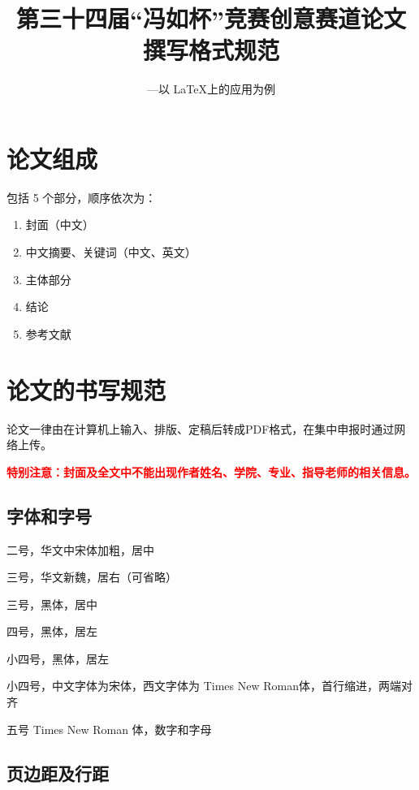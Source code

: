 \documentclass{buaa_fengru}
\title{第三十四届“冯如杯”竞赛创意赛道论文\\撰写格式规范} %
\subtitle{---以 \LaTeX 上的应用为例} %
\begin{document}
\maketitle %


\section{论文组成}

包括 5 个部分，顺序依次为：

\begin{enumerate}[nosep]
    \item 封面（中文）
    \item 中文摘要、关键词（中文、英文）
    \item 主体部分
    \item 结论
    \item 参考文献
\end{enumerate}

\section{论文的书写规范}

论文一律由在计算机上输入、排版、定稿后转成PDF格式，在集中申报时通过网络上传。

\textcolor{red}{
    \bfseries
    特别注意：封面及全文中不能出现作者姓名、学院、专业、指导老师的相关信息。
}

\subsection{字体和字号}

\begin{description}[nosep]
    \item[论文题目] 二号，华文中宋体加粗，居中
    \item[副标题] 三号，华文新魏，居右（可省略）
    \item[章标题] 三号，黑体，居中
    \item[节标题] 四号，黑体，居左
    \item[条标题] 小四号，黑体，居左
    \item[正文] 小四号，中文字体为宋体，西文字体为 Times New Roman体，首行缩进，两端对齐
    \item[页码] 五号 Times New Roman 体，数字和字母
\end{description}

\subsection{页边距及行距}
\end{document}
